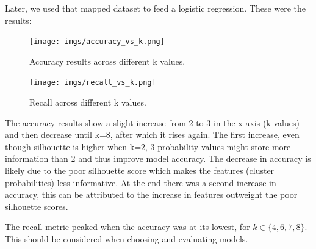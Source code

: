 \documentclass[a4paper,12pt]{article}
\begin{document}
Later, we used that mapped dataset to feed a logistic regression. These were the results:

\begin{figure}[H]
    \centering
    \begin{minipage}{0.48\textwidth}
        \centering
        \texttt{[image: imgs/accuracy\_vs\_k.png]}  %
        \caption{Accuracy results across different k values.}
        \label{fig:silhouette1}
    \end{minipage}
    \hfill
    \begin{minipage}{0.48\textwidth}
        \centering
        \texttt{[image: imgs/recall\_vs\_k.png]}  %
        \caption{Recall across different k values.}
        \label{fig:silhouette2}
    \end{minipage}
\end{figure}


The accuracy results show a slight increase from 2 to 3 in the x-axis (k values) and then decrease until k=8, after which it rises again. The first increase, even though silhouette is higher when k=2, 3 probability values might store more information than 2 and thus improve model accuracy. The decrease in accuracy is likely due to the poor silhouette score which makes the features (cluster probabilities) less informative. At the end there was a second increase in accuracy, this can be attributed to the increase in features outweight the poor silhouette scores.

The recall metric peaked when the accuracy was at its lowest, for \( k \in \{ 4, 6, 7, 8 \} \). This should be considered when choosing and evaluating models.
\end{document}
